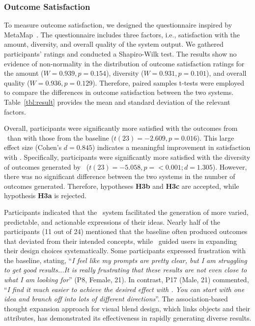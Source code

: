 \subsubsection{Outcome Satisfaction}

To measure outcome satisfaction, we designed the questionnaire inspired by MetaMap~\cite{10.1145/3411764.3445325}. 
The questionnaire includes three factors, i.e., satisfaction with the amount, diversity, and overall quality of the system output.
We gathered participants' ratings and conducted a Shapiro-Wilk test. The results show no evidence of non-normality in the distribution of outcome satisfaction ratings for the amount ($W = 0.939, p =0.154$), diversity ($W = 0.931, p =0.101$), and overall quality ($W = 0.936, p =0.129$). 
Therefore, paired samples t-tests were employed to compare the differences in outcome satisfaction between the two systems.
Table~\ref{tbl:result} provides the mean and standard deviation of the relevant factors.


Overall, participants were significantly more satisfied with the outcomes from \sysname\ than with those from the baseline ($t(23) = -2.609, p = 0.016$).
This large effect size (Cohen's $d = 0.845$) indicates a meaningful improvement in satisfaction with \sysname. 
Specifically, participants were significantly more satisfied with the diversity of outcomes generated by \sysname\ ($t(23) = -5.058, p = <0.001; d = 1.305$). 
However, there was no significant difference between the two systems in the number of outcomes generated. 
Therefore, hypotheses \textbf{H3b} and \textbf{H3c} are accepted, while hypothesis \textbf{H3a} is rejected.

Participants indicated that the \sysname\ system 
facilitated the generation of more varied, predictable, and actionable expressions of their ideas. 
Nearly half of the participants (11 out of 24) mentioned that the baseline often produced outcomes that deviated from their intended concepts, while \sysname\ guided users in expanding their design choices systematically. 
Some participants expressed frustration with the baseline, stating, ``\textit{I feel like my prompts are pretty clear, but I am struggling to get good results...It is really frustrating that these results are not even close to what I am looking for}'' (P8, Female, 21). 
In contrast, P17 (Male, 21) commented, ``\textit{I find it much easier to achieve the desired effect with \sysname. You can start with one idea and branch off into lots of different directions}''.
The association-based thought expansion approach for visual blend design, which links objects and their attributes, has demonstrated its effectiveness in rapidly generating diverse results.




